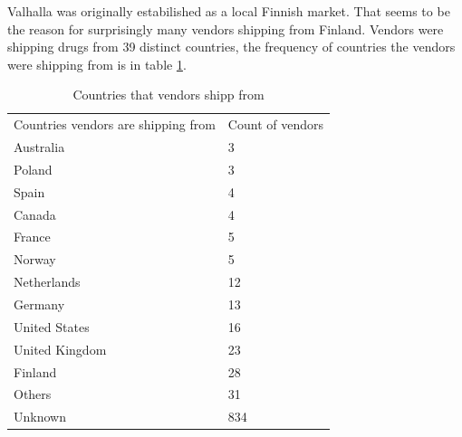 \documentclass[
  digital, %
  table,   %
  lof,     %
  lot,     %
  oneside
]{fithesis3}
\begin{document}
Valhalla was originally estabilished as a local Finnish market.
That seems to be the reason for surprisingly many vendors shipping from Finland.
Vendors were shipping drugs from 39 distinct countries,
the frequency of countries the vendors were shipping from is in table \ref{shipcount}.

\begin{table}
    \caption{Countries that vendors shipp from}
    \label{shipcount}
    \begin{tabular}{|l|l|}
    Countries vendors are shipping from  & Count of vendors\\
        Australia                                    & 3   \\ 
        Poland                                       & 3   \\ 
        Spain                                        & 4   \\ 
        Canada                                       & 4   \\ 
        France                                       & 5   \\ 
        Norway                                       & 5   \\ 
        Netherlands                                  & 12  \\ 
        Germany                                      & 13  \\ 
        United States                                & 16  \\ 
        United Kingdom                               & 23  \\ 
        Finland                                      & 28  \\ 
        Others                                       & 31   \\
        Unknown                                      & 834  
    \end{tabular}
\end{table}
\end{document}
